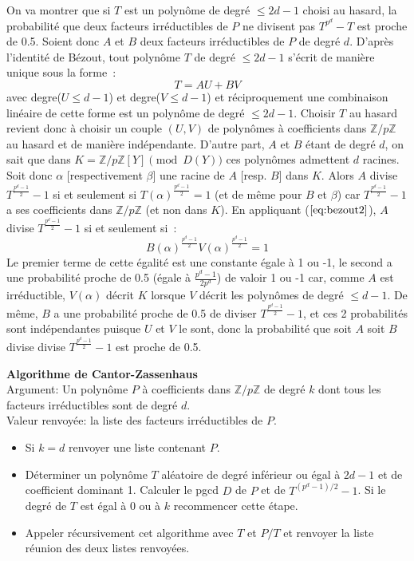 \documentclass[a4paper,11pt]{book}
\begin{document}
\begin{giacjshere}
On va montrer que si $T$ est un polynôme de degré $\leq 2d-1$ choisi au hasard,
la probabilité que deux facteurs irréductibles de $P$ ne divisent pas 
$T^{p^d}-T$ est proche de 0.5. Soient donc $A$ et $B$ deux facteurs
irréductibles de $P$ de degré $d$. D'après l'identité de Bézout, tout 
polynôme $T$ de degré $\leq 2d-1$ s'écrit de manière unique sous la forme~:
\begin{equation} \label{eq:bezout2} 
T = A U + B V 
\end{equation}
avec degre($U \leq d-1$) et degre($V \leq d-1$) et réciproquement 
une combinaison linéaire de cette forme est un polynôme de degré $\leq 2d-1$.
Choisir $T$ au hasard revient donc à choisir un couple $(U,V)$ de polynômes
à coefficients dans $\mathbb{Z}/p\mathbb{Z}$ au hasard et
de manière indépendante. D'autre part, $A$ et $B$ étant de degré $d$, on
sait que dans $K=\mathbb{Z}/p\mathbb{Z}[Y] \pmod{D(Y)}$ ces polynômes admettent $d$ racines.
Soit donc $\alpha$ [respectivement $\beta$] une racine de $A$ [resp. $B$]
dans $K$. Alors $A$ divise $T^{\frac{p^d-1}{2}}-1$
si et seulement si $T(\alpha )^{\frac{p^d-1}{2}}=1$ (et de même pour
$B$ et $\beta$) car $T^{\frac{p^d-1}{2}}-1$ a ses coefficients dans
$\mathbb{Z}/p\mathbb{Z}$ (et non dans $K$). 
En appliquant (\(\ref{eq:bezout2}\)), $A$ divise $T^{\frac{p^d-1}{2}}-1$
si et seulement si~:
\[ B(\alpha )^{\frac{p^d-1}{2}}V(\alpha )^{\frac{p^d-1}{2}}=1 \]
Le premier terme de cette égalité est une constante égale à 1 ou -1, 
le second a une probabilité proche de 0.5 (égale à $\frac{p^d-1}{2p^d}$)
de valoir 1 ou -1 car, comme $A$ est irréductible,
$V(\alpha)$ décrit $K$ lorsque $V$ décrit les 
polynômes de degré $\leq d-1$.
De même, $B$ a une probabilité proche de 0.5 de diviser 
$T^{\frac{p^d-1}{2}}-1$, et ces 2 probabilités sont indépendantes
puisque $U$ et $V$ le sont, donc la probabilité que soit $A$ soit $B$ divise
divise $T^{\frac{p^d-1}{2}}-1$ est proche de 0.5.

{\bf Algorithme de Cantor-Zassenhaus}\\
Argument: Un polynôme $P$ à coefficients dans $\mathbb{Z}/p\mathbb{Z}$ de degré $k$
dont tous les facteurs irréductibles sont de degré $d$.\\
Valeur renvoyée: la liste des facteurs irréductibles de $P$.\\
\begin{itemize}
\item Si $k=d$ renvoyer une liste contenant $P$.
\item Déterminer un polynôme $T$ aléatoire de degré inférieur ou égal
à $2d-1$ et de coefficient dominant 1. Calculer le pgcd $D$ de $P$
et de $T^{(p^d-1)/2}-1$. Si le degré de $T$ est égal à 0 ou à $k$ 
recommencer cette étape.
\item Appeler récursivement cet algorithme avec $T$ et $P/T$ et
renvoyer la liste réunion des deux listes renvoyées.
\end{itemize}


\end{giacjshere}
\end{document}

